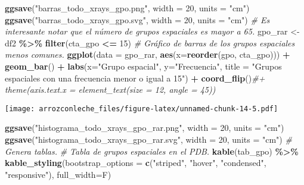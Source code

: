 \documentclass[
]{book}
\newenvironment{Shaded}{\begin{snugshade}}{\end{snugshade}}
\newcommand{\CommentTok}[1]{\textcolor[rgb]{0.56,0.35,0.01}{\textit{#1}}}
\newcommand{\DataTypeTok}[1]{\textcolor[rgb]{0.13,0.29,0.53}{#1}}
\newcommand{\DecValTok}[1]{\textcolor[rgb]{0.00,0.00,0.81}{#1}}
\newcommand{\KeywordTok}[1]{\textcolor[rgb]{0.13,0.29,0.53}{\textbf{#1}}}
\newcommand{\NormalTok}[1]{#1}
\newcommand{\OperatorTok}[1]{\textcolor[rgb]{0.81,0.36,0.00}{\textbf{#1}}}
\newcommand{\StringTok}[1]{\textcolor[rgb]{0.31,0.60,0.02}{#1}}
\begin{document}
\begin{Shaded}
\begin{Highlighting}[]
\KeywordTok{ggsave}\NormalTok{(}\StringTok{"barras\_todo\_xrays\_gpo.png"}\NormalTok{, }\DataTypeTok{width =} \DecValTok{20}\NormalTok{, }\DataTypeTok{units =} \StringTok{"cm"}\NormalTok{)}
\KeywordTok{ggsave}\NormalTok{(}\StringTok{"barras\_todo\_xrays\_gpo.svg"}\NormalTok{, }\DataTypeTok{width =} \DecValTok{20}\NormalTok{, }\DataTypeTok{units =} \StringTok{"cm"}\NormalTok{)}
\CommentTok{\# Es interesante notar que el número de grupos espaciales es mayor a 65.}
\NormalTok{gpo\_rar \textless{}{-}}\StringTok{ }\NormalTok{df2 }\OperatorTok{\%\textgreater{}\%}
\StringTok{  }\KeywordTok{filter}\NormalTok{(cta\_gpo }\OperatorTok{\textless{}=}\StringTok{ }\DecValTok{15}\NormalTok{)}
\CommentTok{\# Gráfico de barras de los grupos espaciales menos comunes. }
\KeywordTok{ggplot}\NormalTok{(}\DataTypeTok{data =}\NormalTok{ gpo\_rar, }\KeywordTok{aes}\NormalTok{(}\DataTypeTok{x=}\KeywordTok{reorder}\NormalTok{(gpo, cta\_gpo))) }\OperatorTok{+}\StringTok{ }\KeywordTok{geom\_bar}\NormalTok{() }\OperatorTok{+}\StringTok{ }\KeywordTok{labs}\NormalTok{(}\DataTypeTok{x=}\StringTok{"Grupo espacial"}\NormalTok{, }\DataTypeTok{y=}\StringTok{"Frecuencia"}\NormalTok{, }\DataTypeTok{title =} \StringTok{"Grupos espaciales con una frecuencia menor o igual a 15"}\NormalTok{) }\OperatorTok{+}\StringTok{ }\KeywordTok{coord\_flip}\NormalTok{()}\CommentTok{\#+ theme(axis.text.x = element\_text(size = 12, angle = 45)) }
\end{Highlighting}
\end{Shaded}

\texttt{[image: arrozconleche\_files/figure-latex/unnamed-chunk-14-5.pdf]}

\begin{Shaded}
\begin{Highlighting}[]
\KeywordTok{ggsave}\NormalTok{(}\StringTok{"histograma\_todo\_xrays\_gpo\_rar.png"}\NormalTok{, }\DataTypeTok{width =} \DecValTok{20}\NormalTok{, }\DataTypeTok{units =} \StringTok{"cm"}\NormalTok{)}
\KeywordTok{ggsave}\NormalTok{(}\StringTok{"histograma\_todo\_xrays\_gpo\_rar.svg"}\NormalTok{, }\DataTypeTok{width =} \DecValTok{20}\NormalTok{, }\DataTypeTok{units =} \StringTok{"cm"}\NormalTok{)}
\CommentTok{\# Genera tablas.}
\CommentTok{\# Tabla de grupos espaciales en el PDB.}
\KeywordTok{kable}\NormalTok{(tab\_gpo) }\OperatorTok{\%\textgreater{}\%}
\StringTok{  }\KeywordTok{kable\_styling}\NormalTok{(}\DataTypeTok{bootstrap\_options =} \KeywordTok{c}\NormalTok{(}\StringTok{"striped"}\NormalTok{, }\StringTok{"hover"}\NormalTok{, }\StringTok{"condensed"}\NormalTok{, }\StringTok{"responsive"}\NormalTok{), }\DataTypeTok{full\_width=}\NormalTok{F)}
\end{Highlighting}
\end{Shaded}
\end{document}
